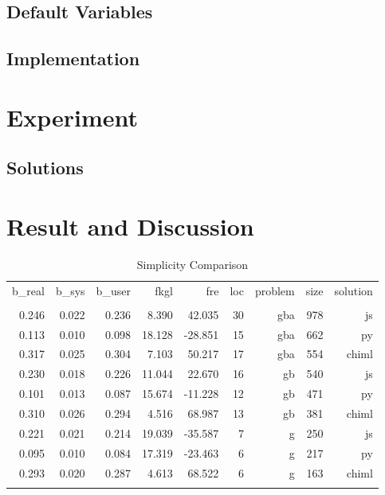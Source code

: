 \documentclass[conference]{IEEEtran}
\begin{document}
\subsection{Default Variables}

\subsection{Implementation}

\section{Experiment}

\subsection{Solutions}

\section{Result and Discussion}

\begin{table}[]
\centering
\caption{Simplicity Comparison}
\label{tbl:simplicityTest}
\begin{tabular}{@{}rrrrrrrrr@{}}
\toprule
  b\_real & b\_sys  & b\_user &   fkgl &     fre &  loc & problem  & size &  solution \\
          &         &         &        &         &      &          &      &           \\ \midrule 
  0.246   & 0.022   & 0.236   &  8.390 &  42.035 &  30  &   gba    & 978  &     js    \\
  0.113   & 0.010   & 0.098   & 18.128 & -28.851 &  15  &   gba    & 662  &     py    \\
  0.317   & 0.025   & 0.304   &  7.103 &  50.217 &  17  &   gba    & 554  &  chiml    \\
  0.230   & 0.018   & 0.226   & 11.044 &  22.670 &  16  &    gb    & 540  &     js    \\
  0.101   & 0.013   & 0.087   & 15.674 & -11.228 &  12  &    gb    & 471  &     py    \\
  0.310   & 0.026   & 0.294   &  4.516 &  68.987 &  13  &    gb    & 381  &  chiml    \\
  0.221   & 0.021   & 0.214   & 19.039 & -35.587 &   7  &     g    & 250  &     js    \\
  0.095   & 0.010   & 0.084   & 17.319 & -23.463 &   6  &     g    & 217  &     py    \\
  0.293   & 0.020   & 0.287   &  4.613 &  68.522 &   6  &     g    & 163  &  chiml    \\
          &         &         &        &         &      &          &      &           \\ \midrule 
\end{tabular}
\end{table}
\end{document}
